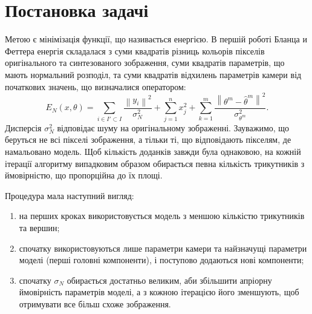 \section{Постановка задачі}

Метою є мінімізація функції, що називається енергією.
В першій роботі Бланца и Феттера \cite{blanz:romdhani:vetter}
енергія складалася з
суми квадратів різниць кольорів пікселів
оригінального та синтезованого зображення,
суми квадратів параметрів, що мають нормальний розподіл,
та суми квадратів відхилень параметрів камери від початкових значень,
що визначалися оператором:
\begin{equation}\label{eq:energy:blanz}
  E_N\left( x, \theta \right)
  = \sum_{i \in I' \subset I}
      \frac{\left\| y_i \right\|^2}{\sigma^2_N}
  + \sum_{j = 1}^{n} x_j^2
  + \sum_{k = 1}^{m}
      \frac{\left\| \theta^m - \hat{\theta}^m \right\|^2}
           {\sigma^2_{\theta^m}}.
\end{equation}
Дисперсія $\sigma_N^2$ відповідає шуму на оригінальному зображенні.
Зауважимо, що беруться не всі пікселі зображення,
а тільки ті, що відповідають пікселям, де намальовано модель.
Щоб кількість доданків завжди була однаковою,
на кожній ітерації алгоритму випадковим образом
обирається певна кількість трикутників
з ймовірністю, що пропорційна до їх площі.

Процедура мала наступний вигляд:
\begin{enumerate}
  \item на перших кроках використовується модель
    з меншою кількістю трикутників та вершин;
  \item спочатку використовуються лише параметри камери
    та найзначущі параметри моделі (перші головні компоненти),
    і поступово додаються нові компоненти;
  \item спочатку $\sigma_N$ обирається достатньо великим,
    аби збільшити апріорну ймовірність параметрів моделі,
    а з кожною ітерацією його зменшують,
    щоб отримувати все більш схоже зображення.
\end{enumerate}

